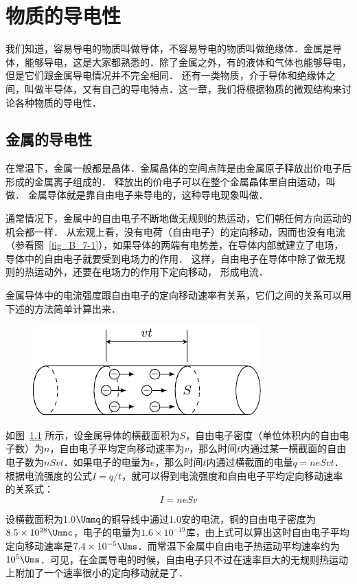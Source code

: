 \chapter{物质的导电性}\label{chapter-conductivity-of-matter}

我们知道，容易导电的物质叫做导体，不容易导电的物质叫做绝缘体．金属是导体，能够导电，这是大家都熟悉的．除了金属之外，有的液体和气体也能够导电，但是它们跟金属导电情况并不完全相同．
还有一类物质，介于导体和绝缘体之间，叫做半导体，又有自己的导电特点．这一章，我们将根据物质的微观结构来讨论各种物质的导电性．

\section{金属的导电性}

在常温下，金属一般都是晶体．金属晶体的空间点阵是由金属原子释放出价电子后形成的金属离子组成的．
释放出的价电子可以在整个金属晶体里自由运动，叫做．
金属导体就是靠自由电子来导电的，这种导电现象叫做．


通常情况下，金属中的自由电子不断地做无规则的热运动，它们朝任何方向运动的机会都一样．
从宏观上看，没有电荷（自由电子）的定向移动，因而也没有电流（参看图~\ref{fig_B_7-1}），如果导体的两端有电势差，在导体内部就建立了电场，导体中的自由电子就要受到电场力的作用．
这样，自由电子在导体中除了做无规则的热运动外，还要在电场力的作用下定向移动，
形成电流．

金属导体中的电流强度跟自由电子的定向移动速率有关系，它们之间的关系可以用下述的方法简单计算出来．
\begin{figure}[htbp]
    \centering
    \includegraphics{fig/B/8-1.pdf}
    \caption{}\label{fig_B_8-1}
\end{figure}

如图~\ref{fig_B_8-1} 所示，设金属导体的横截面积为$S$，自由电子密度（单位体积内的自由电子数）为$n$，自由电子平均定向移动速率为$v$，那么时间$t$内通过某一横截面的自由电子数为$nSvt$．如果电子的电量为$e$，那么时间$t$内通过横截面的电量$q=neSvt$．根据电流强度的公式$I=q/t$，就可以得到电流强度和自由电子平均定向移动速率的关系式：
\[I=neSv\]

设横截面积为1.0$\Ummq$的铜导线中通过1.0安的电流，铜的自由电子密度为$8.5\times10^{28} \Umnc$，电子的电量为$1.6\times10^{-19}$库，由上式可以算出这时自由电子平均定向移动速率是$7. 4\times10^{-5}\Ums$．而常温下金属中自由电子热运动平均速率约为$10^5\Ums$．可见，在金属导电的时候，自由电子只不过在速率巨大的无规则热运动上附加了一个速率很小的定向移动就是了．

